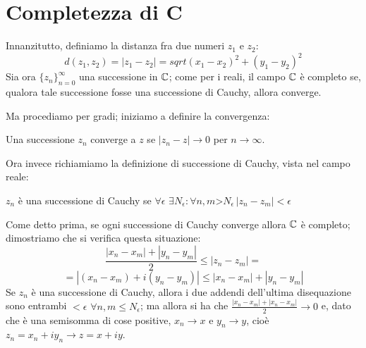 \chapter{Completezza di C}

Innanzitutto, definiamo la distanza fra due numeri $z_1$ e $z_2$:
$$d(z_1,z_2)=|z_1-z_2|=sqrt{(x_1-x_2)^2+(y_1-y_2)^2}$$
Sia ora $\{z_n\}_{n=0}^{\infty}$ una successione in $\mathbb{C}$; come per i reali, il campo $\mathbb{C}$ è completo se, qualora tale successione fosse una successione di Cauchy, allora converge.

Ma procediamo per gradi; iniziamo a definire la convergenza:

\begin{definizione}
 Una successione $z_n$ converge a $z$ se $|z_n-z|\to0$ per $n\to\infty$.
\end{definizione} Ora invece richiamiamo la definizione di successione di Cauchy, vista nel campo reale:
\begin{definizione}
$z_n$ è una successione di Cauchy se $\forall \epsilon$  $\exists N_{\epsilon} : \forall n,m$>$N_{\epsilon} \, |z_n-z_m| < \epsilon$
\end{definizione} Come detto prima, se ogni successione di Cauchy converge allora $\mathbb{C}$ è completo; dimostriamo che si verifica questa situazione:
$$\frac{|x_n-x_m|+|y_n-y_m|}{2}\leq |z_n-z_m|=$$
$$=|(x_n-x_m)+i(y_n-y_m)|\leq |x_n-x_m|+|y_n-y_m|$$
Se $z_n$ è una successione di Cauchy, allora i due addendi dell'ultima disequazione sono entrambi $<\epsilon$ $\forall n,m\leq N_{\epsilon}$; ma allora si ha che $\frac{|x_n-x_m|+|x_n-x_m|}{2} \to 0$ e, dato che è una semisomma di cose positive, $x_n\to x$ e $y_n\to y$, cioè $z_n=x_n+iy_n \to z=x+iy$.